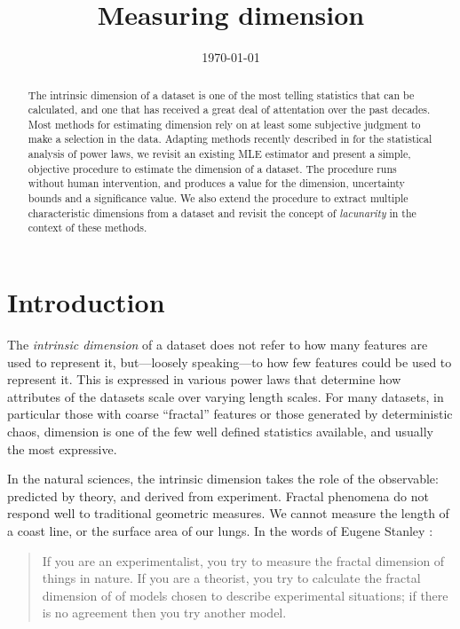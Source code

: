 \documentclass[11pt]{article}
\title{Measuring dimension}
\date{\today}
\begin{document}
\maketitle

\begin{abstract}
\noindent The intrinsic dimension of a dataset is one of the most telling statistics that can be calculated, and one that has received a great deal of attentation over the past decades. Most methods for estimating dimension rely on at least some subjective judgment to make a selection in the data. Adapting methods recently described in \cite{clauset2007power} for the statistical analysis of power laws, we revisit an existing MLE estimator and present a simple, objective procedure to estimate the dimension of a dataset. The procedure runs without human intervention, and produces a value for the dimension, uncertainty bounds and a significance value. We also extend the procedure to extract multiple characteristic dimensions from a dataset and revisit the concept of \textit{lacunarity} in the context of these methods.\end{abstract}
\section{Introduction}
The \textit{intrinsic dimension} of a dataset does not refer to how many features are used to represent it, but---loosely speaking---to how few features could be used to represent it. This is expressed in various power laws that determine how attributes of the datasets scale over varying length scales. For many datasets, in particular those with coarse ``fractal'' features or those generated by deterministic chaos, dimension is one of the few well defined statistics available, and usually the most expressive.

In the natural sciences, the intrinsic dimension takes the role of the observable: predicted by theory, and derived from experiment. Fractal phenomena do not respond well to traditional geometric measures. We cannot measure the length of a coast line, or the surface area of our lungs. In the words of Eugene Stanley \cite{stanley1986growth}:

\begin{quotation}
\small
\noindent If you are an experimentalist, you try to measure the fractal dimension of things in nature. If you are a theorist, you try to calculate the fractal dimension of of models chosen to describe experimental situations; if there is no agreement then you try another model.
\end{quotation}
\end{document}
